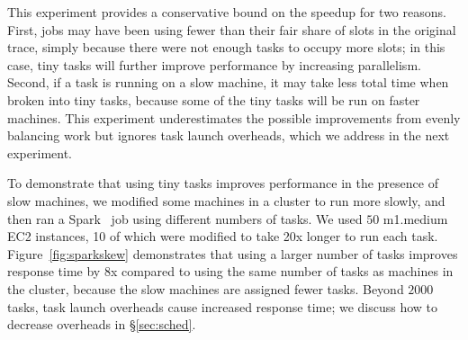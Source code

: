 This experiment provides a conservative bound on the speedup for two reasons. First, jobs
may have been using fewer than their fair share of slots in the original trace,
simply because there were not enough tasks to occupy more slots; in this case,
tiny tasks will further improve performance by increasing parallelism. Second,
if a task is running on a slow machine, it may take less total time when
broken into tiny tasks, because some of the tiny tasks will be run on faster
machines.
This experiment underestimates the possible improvements from
evenly balancing work but ignores task launch overheads, which
we address in the next experiment.



To demonstrate that using tiny tasks improves performance in
the presence of slow machines,
we modified some machines in a cluster to run more slowly, and then
ran a Spark~\cite{zaharia2010spark} job using different numbers of tasks.
We used $50$ m1.medium EC2
instances, 10 of which were modified to take 20x longer to run each task.
Figure~\ref{fig:sparkskew} demonstrates that using a larger number of tasks
improves response time by 8x compared to using the same number
of tasks as machines in the cluster, because the slow machines are
assigned fewer tasks. Beyond $2000$ tasks, task launch overheads cause increased response time; we discuss
how to decrease overheads in \S\ref{sec:sched}.

